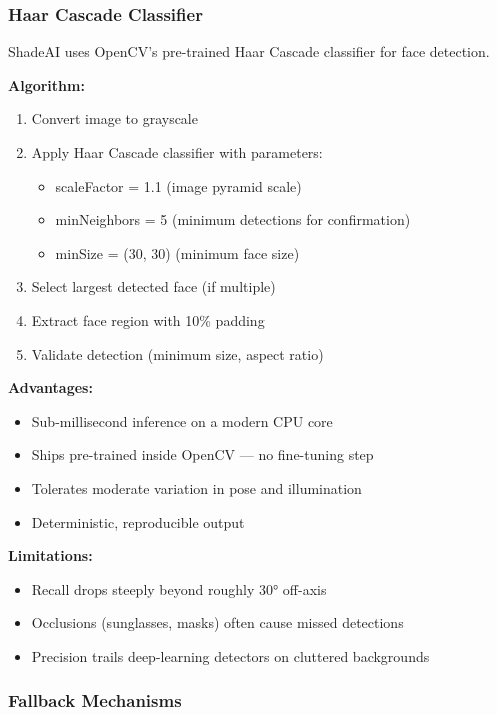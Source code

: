 \subsubsection{Haar Cascade Classifier}

ShadeAI uses OpenCV's pre-trained Haar Cascade classifier for face detection.

\textbf{Algorithm:}
\begin{enumerate}
    \item Convert image to grayscale
    \item Apply Haar Cascade classifier with parameters:
    \begin{itemize}
        \item scaleFactor = 1.1 (image pyramid scale)
        \item minNeighbors = 5 (minimum detections for confirmation)
        \item minSize = (30, 30) (minimum face size)
    \end{itemize}
    \item Select largest detected face (if multiple)
    \item Extract face region with 10\% padding
    \item Validate detection (minimum size, aspect ratio)
\end{enumerate}

\textbf{Advantages:}
\begin{itemize}
    \item Sub-millisecond inference on a modern CPU core
    \item Ships pre-trained inside OpenCV — no fine-tuning step
    \item Tolerates moderate variation in pose and illumination
    \item Deterministic, reproducible output
\end{itemize}

\textbf{Limitations:}
\begin{itemize}
    \item Recall drops steeply beyond roughly 30° off-axis
    \item Occlusions (sunglasses, masks) often cause missed detections
    \item Precision trails deep-learning detectors on cluttered backgrounds
\end{itemize}

\subsubsection{Fallback Mechanisms}

